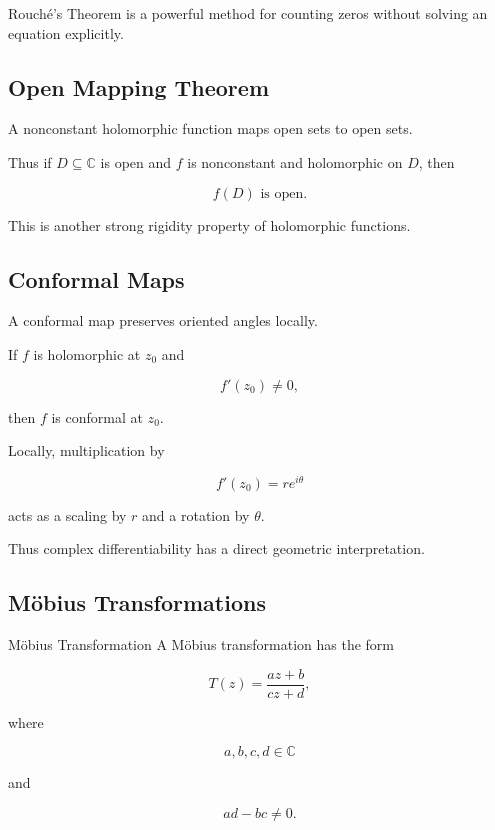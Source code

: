Rouch\'e's Theorem is a powerful method for counting zeros without solving
an equation explicitly.

\subsection{Open Mapping Theorem}
\label{subsec:open-mapping-theorem-complex}

\begin{theorem}
A nonconstant holomorphic function maps open sets to open sets.
\end{theorem}

Thus if \(D\subseteq\mathbb{C}\) is open and \(f\) is nonconstant and
holomorphic on \(D\), then

\[
\boxed{
f(D)
\text{ is open}.
}
\]

This is another strong rigidity property of holomorphic functions.

\subsection{Conformal Maps}
\label{subsec:conformal-maps}

A conformal map preserves oriented angles locally.

If \(f\) is holomorphic at \(z_0\) and

\[
\boxed{
f'(z_0)\neq0,
}
\]

then \(f\) is conformal at \(z_0\).

Locally, multiplication by

\[
f'(z_0)
=
re^{i\theta}
\]

acts as a scaling by \(r\) and a rotation by \(\theta\).

Thus complex differentiability has a direct geometric interpretation.

\subsection{M\"obius Transformations}
\label{subsec:mobius-transformations}

\begin{definitionbox}{M\"obius Transformation}
A M\"obius transformation has the form

\[
\boxed{
T(z)
=
\frac{az+b}{cz+d},
}
\]

where

\[
a,b,c,d\in\mathbb{C}
\]

and

\[
\boxed{
ad-bc\neq0.
}
\]
\end{definitionbox}

